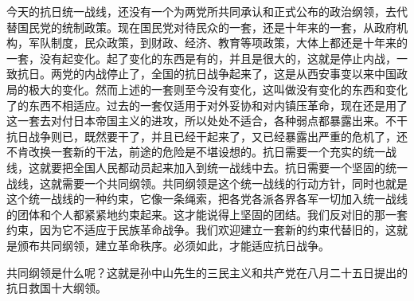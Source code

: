 今天的抗日统一战线，还没有一个为两党所共同承认和正式公布的政治纲领，去代替国民党的统制政策。现在国民党对待民众的一套，还是十年来的一套，从政府机构，军队制度，民众政策，到财政、经济、教育等项政策，大体上都还是十年来的一套，没有起变化。起了变化的东西是有的，并且是很大的，这就是停止内战，一致抗日。两党的内战停止了，全国的抗日战争起来了，这是从西安事变以来中国政局的极大的变化。然而上述的一套则至今没有变化，这叫做没有变化的东西和变化了的东西不相适应。过去的一套仅适用于对外妥协和对内镇压革命，现在还是用了这一套去对付日本帝国主义的进攻，所以处处不适合，各种弱点都暴露出来。不干抗日战争则已，既然要干了，并且已经干起来了，又已经暴露出严重的危机了，还不肯改换一套新的干法，前途的危险是不堪设想的。抗日需要一个充实的统一战线，这就要把全国人民都动员起来加入到统一战线中去。抗日需要一个坚固的统一战线，这就需要一个共同纲领。共同纲领是这个统一战线的行动方针，同时也就是这个统一战线的一种约束，它像一条绳索，把各党各派各界各军一切加入统一战线的团体和个人都紧紧地约束起来。这才能说得上坚固的团结。我们反对旧的那一套约束，因为它不适应于民族革命战争。我们欢迎建立一套新的约束代替旧的，这就是颁布共同纲领，建立革命秩序。必须如此，才能适应抗日战争。

共同纲领是什么呢？这就是孙中山先生的三民主义和共产党在八月二十五日提出的抗日救国十大纲领。

